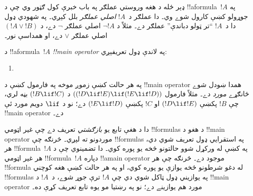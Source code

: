 \documentclass[../../../include/open-logic-section]{subfiles}
\begin{document}


\begin{explain}
ډېر ځله د هغه وروستي عملګر په باب خبرې کول ګټور وي چې د
!!a{formula}~$!A$ په جوړولو کښې کارول شوے وي۔ دا عملګر د~$!A$
\emph{اصلي عملګر} بلل کېږي۔ په شهودي ډول دا د~$!A$ ``تر ټولو دباندې''
عملګر دے۔ مثلاً د $\lnot !A$ اصلي عملګر $\lnot$ دے، د $(!A \lor
!B)$ اصلي عملګر $\lor$ دے، او همداسې نور۔
\end{explain}


\begin{defn}
د !!a{formula}~$!A$ \emph{!!{main operator}} په لاندې ډول تعريفېږي:
\begin{enumerate}
\item {}







\end{enumerate}
\end{defn}

په هر حالت کښې زموږ موخه په فارمول کښې د !!{main operator} همدا ښودل
شوے ځانګړے \emph{مورد} دے۔ مثلاً فارمول $((!D \lif !E) \lif (!E
\lif !D))$ د $(!B \lif !C)$ بڼه لري، چې $!B$ پکښې $(!D \lif !E)$
او $!C$ پکښې $(!E \lif !D)$ دے؛ نو د $\lif$ دويم مورد ئې
!!{main operator} دے۔

\begin{explain}
دا د هغې تابع يو \emph{بازګشتي} تعريف دے چې غير اټومي
!!{formula}s د هغو د !!{main operator} موردونو ته لېږي۔ څرنګه چې
!!{formula}s په استقرايي ډول تعريف شوي دي، هر !!{formula}~$!A$ په
 کښې له ورکړل شوو حالتونو څخه يو پوره کوي۔ دا
تضمينوي چې د هر غير اټومي !!{formula}~$!A$ دپاره !!a{main
  operator} موجود دے۔ څرنګه چې هر !!{formula} له دغو شرطونو څخه
يوازې يو پوره کوي، او په هر حالت کښې هغه کوچني !!{formula}s په
يوازيني ډول ټاکل شوي دي چې $!A$ ترې جوړ شوے، د~$!A$ د !!{main
  operator} مورد هم يوازينے دے؛ نو په رښتيا مو يوه تابع تعريف کړې ده۔
\end{explain}
\end{document}
